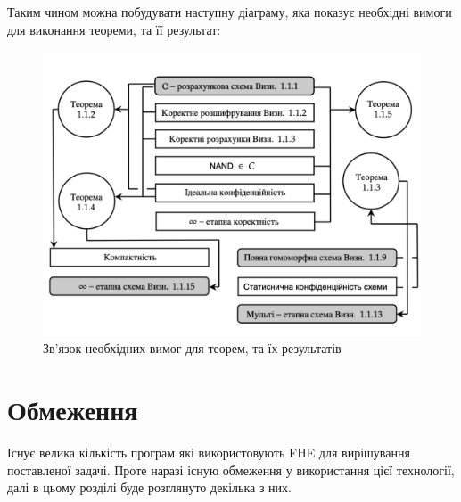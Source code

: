 Таким чином можна побудувати наступну діаграму, яка показує необхідні вимоги для 
виконання теореми, та її результат:

\begin{figure}[!h]
    \centering
    \includegraphics[scale=0.5]{static/fhe-i-hop-connection.png}
    \caption{Зв'язок необхідних вимог для теорем, та їх результатів}
    \label{fig:fhe-i-hop-connection}
\end{figure}

\section{Обмеження}
Існує велика кількість програм які використовують FHE для вирішування поставленої задачі. Проте
наразі існую обмеження у використання цієї технології, далі в цьому розділі буде розглянуто 
декілька з них. 

